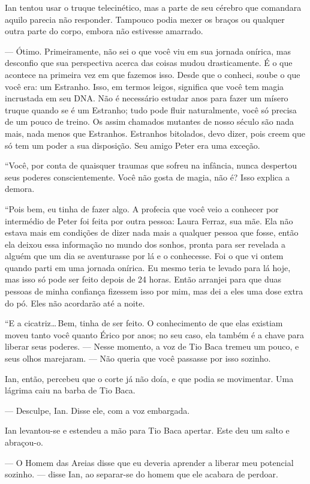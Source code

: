 Ian tentou usar o truque telecinético, mas a parte de seu cérebro que
comandara aquilo parecia não responder. Tampouco podia mexer os braços
ou qualquer outra parte do corpo, embora não estivesse amarrado.

--- Ótimo. Primeiramente, não sei o que você viu em sua jornada onírica,
mas desconfio que sua perspectiva acerca das coisas mudou drasticamente.
É o que acontece na primeira vez em que fazemos isso. Desde que o
conheci, soube o que você era: um Estranho. Isso, em termos leigos,
significa que você tem magia incrustada em seu DNA. Não é necessário
estudar anos para fazer um mísero truque quando se é um Estranho; tudo
pode fluir naturalmente, você só precisa de um pouco de treino. Os assim
chamados mutantes de nosso século são nada mais, nada menos que
Estranhos. Estranhos bitolados, devo dizer, pois creem que só tem um
poder a sua disposição. Seu amigo Peter era uma exceção.

“Você, por conta de quaisquer traumas que sofreu na infância, nunca
despertou seus poderes conscientemente. Você não gosta de magia, não é?
Isso explica a demora.

“Pois bem, eu tinha de fazer algo. A profecia que você veio a conhecer
por intermédio de Peter foi feita por outra pessoa: Laura Ferraz, sua
mãe. Ela não estava mais em condições de dizer nada mais a qualquer
pessoa que fosse, então ela deixou essa informação no mundo dos sonhos,
pronta para ser revelada a alguém que um dia se aventurasse por lá e o
conhecesse. Foi o que vi ontem quando parti em uma jornada onírica. Eu
mesmo teria te levado para lá hoje, mas isso só pode ser feito depois de
24 horas. Então arranjei para que duas pessoas de minha confiança
fizessem isso por mim, mas dei a eles uma dose extra do pó. Eles não
acordarão até a noite.

“E a cicatriz\ldots\,Bem, tinha de ser feito. O conhecimento de que elas
existiam moveu tanto você quanto Érico por anos; no seu caso, ela também
é a chave para liberar seus poderes. --- Nesse momento, a voz de Tio
Baca tremeu um pouco, e seus olhos marejaram. --- Não queria que você
passasse por isso sozinho.

Ian, então, percebeu que o corte já não doía, e que podia se movimentar.
Uma lágrima caiu na barba de Tio Baca.

--- Desculpe, Ian. Disse ele, com a voz embargada.

Ian levantou-se e estendeu a mão para Tio Baca apertar. Este deu um
salto e abraçou-o.

--- O Homem das Areias disse que eu deveria aprender a liberar meu
potencial sozinho. --- disse Ian, ao separar-se do homem que ele acabara
de perdoar.

